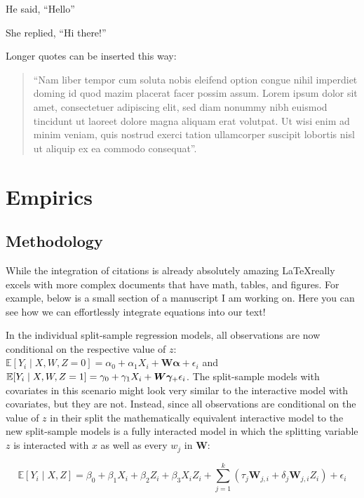 \documentclass{article}
\begin{document}
He said, ``Hello'' \citep[p. 10]{smith2020impact}

She replied, ``Hi there!''  \citep[p. 11]{smith2020impact}


Longer quotes can be inserted this way:

\begin{quote}
``Nam liber tempor cum soluta nobis eleifend option congue nihil imperdiet doming id quod mazim placerat facer possim assum. Lorem ipsum dolor sit amet, consectetuer adipiscing elit, sed diam nonummy nibh euismod tincidunt ut laoreet dolore magna aliquam erat volutpat. Ut wisi enim ad minim veniam, quis nostrud exerci tation ullamcorper suscipit lobortis nisl ut aliquip ex ea commodo consequat''\citep[p. 10]{smith2020impact}.
\end{quote}

\newpage
\section{Empirics}
\label{sec:empirics}

\subsection{Methodology}
\label{sec:methods}

While the integration of citations is already absolutely amazing \LaTeX really excels with more complex documents that have math, tables, and figures. For example, below is a small section of a manuscript I am working on. Here you can see how we can effortlessly integrate equations into our text! 


In the individual split-sample regression models, all observations are now conditional on the respective value of $z$: $\mathbb{E}[Y_{i} \mid X, W,Z = 0]  = \alpha_{0} + \alpha_{1}X_{i} + \bm{W \alpha} + \epsilon_{i}$ and $ \mathbb{E}[Y_{i} \mid X, W,Z = 1]  = \gamma_{0} + \gamma_{1}X_{i} + \bm{W\gamma_}  + \epsilon_{i}$. The split-sample models with covariates in this scenario might look very similar to the interactive model with covariates, but they are not. Instead, since all observations are conditional on the value of $z$ in their split the mathematically equivalent interactive model to the new split-sample models is a fully interacted model in which the splitting variable $z$ is interacted with $x$ as well as every $w_j$ in $\bm{W}$: \useshortskip

\begin{equation}
\label{eq:interaction_model_full}
 \mathbb{E}[Y_{i} \mid X,Z]  = \beta_{0} + \beta_{1}X_{i} + \beta_{2}Z_{i}  + \beta_{3} X_{i}Z_{i} + \sum_{j=1}^{k} (\tau_{j} \bm{W}_{j,i} + \delta_{j} \bm{W}_{j,i} Z_{i}) + \epsilon_{i}   
\end{equation}
\end{document}
